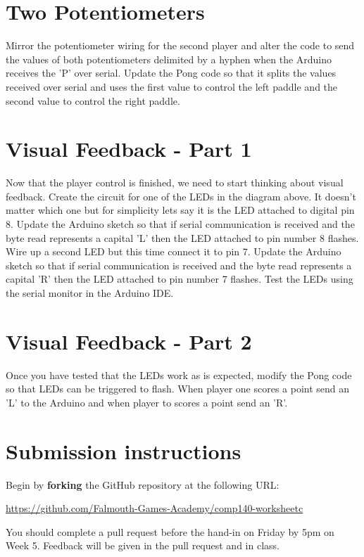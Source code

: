 \documentclass{../../../fal_assignment}
\begin{document}
\section{Two Potentiometers} \label{arduino-second}
Mirror the potentiometer wiring for the second player and alter the code to send the values of both potentiometers delimited by a hyphen when the Arduino receives the 'P' over serial. Update the Pong code so that it splits the values received over serial and uses the first value to control the left paddle and the second value to control the right paddle. 

\section{Visual Feedback - Part 1} \label{arduino-third}
Now that the player control is finished, we need to start thinking about visual feedback. Create the circuit for one of the LEDs in the diagram above. It doesn't matter which one but for simplicity lets say it is the LED attached to digital pin 8. Update the Arduino sketch so that if serial communication is received and the byte read represents a capital 'L' then the LED attached to pin number 8 flashes. Wire up a second LED but this time connect it to pin 7. Update the Arduino sketch so that if serial communication is received and the byte read represents a capital 'R' then the LED attached to pin number 7 flashes. Test the LEDs using the serial monitor in the Arduino IDE. 

\section{Visual Feedback - Part 2} \label{arduino-fourth}
Once you have tested that the LEDs work as is expected, modify the Pong code so that LEDs can be triggered to flash. When player one scores a point send an 'L' to the Arduino and when player to scores a point send an 'R'.



\section*{Submission instructions}

Begin by \textbf{forking} the GitHub repository at the following URL:

\url{https://github.com/Falmouth-Games-Academy/comp140-worksheetc}

You should complete a pull request before the hand-in on Friday by 5pm on Week 5. Feedback will be given in the pull request and in class.
\end{document}
